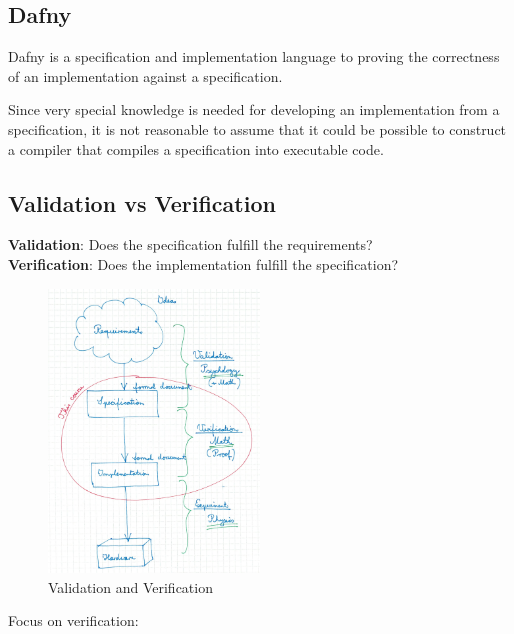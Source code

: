 \hypertarget{dafny}{%
\subsection{Dafny}\label{dafny}}

Dafny is a specification and implementation language to proving the
correctness of an implementation against a specification.

Since very special knowledge is needed for developing an implementation
from a specification, it is not reasonable to assume that it could be
possible to construct a compiler that compiles a specification into
executable code.

\hypertarget{validation-vs-verification}{%
\subsection{Validation vs
Verification}\label{validation-vs-verification}}

\textbf{Validation}: Does the specification fulfill the requirements?\\
\textbf{Verification}: Does the implementation fulfill the
specification?

\begin{figure}[H]
\centering
\includegraphics[width=0.5\textwidth]{figures/validationverification.png}
\caption{Validation and Verification}
\end{figure}

Focus on verification:

